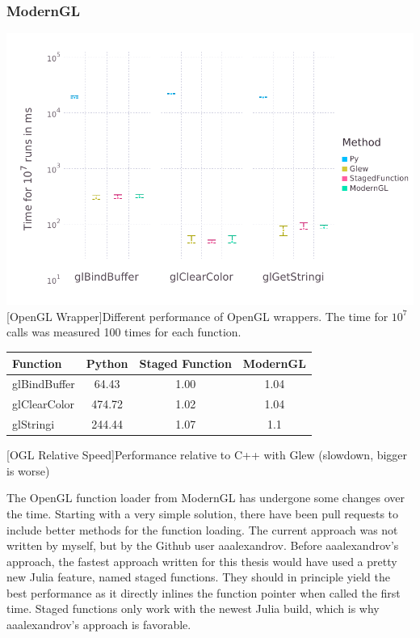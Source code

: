 \subsubsection{ModernGL}
\vspace{1em}
\begin{minipage}{\linewidth}
    \centering
    \includegraphics[width=0.9\linewidth]{graphics/glbench.pdf}
    [OpenGL Wrapper]{Different performance of OpenGL wrappers. The time for $10^7$ calls was measured 100 times for each function.}
    \label{fig:openglwrapper}
\end{minipage}
\begin{table}[htbp]
    \centering
    \begin{tabular}{l|c|c|c}
        \hline
        \textbf{Function}   & \textbf{Python}    & \textbf{Staged Function} & \textbf{ModernGL} \\
        \hline
        glBindBuffer        & 64.43              & 1.00 & 1.04 \\
        glClearColor        & 474.72             & 1.02 & 1.04 \\
        glStringi           & 244.44             & 1.07 & 1.1  \\
    \end{tabular}
    [OGL Relative Speed]{Performance relative to C++ with Glew (slowdown, bigger is worse)}
    \label{table:relativespeedoglw}
\end{table}

The OpenGL function loader from ModernGL has undergone some changes over the time. 
Starting with a very simple solution, there have been pull requests to include better methods for the function loading.
The current approach was not written by myself, but by the Github user aaalexandrov.
Before aaalexandrov's approach, the fastest approach written for this thesis would have used a pretty new Julia feature, named staged functions. 
They should in principle yield the best performance as it directly inlines the function pointer when called the first time.
Staged functions only work with the newest Julia build, which is why aaalexandrov's approach is favorable.

